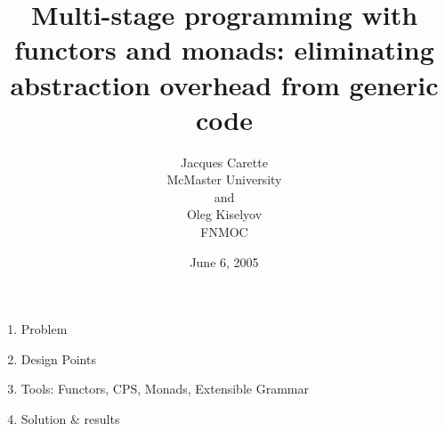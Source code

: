 \documentclass[landscape]{slides}
\begin{document}
\pagestyle{empty}

\setlength{\topmargin}{0in}
\setlength{\headheight}{0.0in}
\setlength{\headsep}{0in}
\setlength{\topskip}{0in}
\setlength{\footskip}{0in}

\newcommand{\vsi}{\vspace{-5mm}}
\newcommand{\vsii}{\vspace{-7mm}}
\newcommand{\vsiii}{\vspace{-11mm}}

\newcommand{\seq}[1]{{\langle #1 \rangle}}
\newcommand{\set}[1]{{\{ #1 \}}}
\newcommand{\tuple}[1]{{( #1 )}}
\newcommand{\mname}[1]{\mbox{\sf #1}}
\newcommand{\Nat}{\mathbb N}


\begin{slide}
\title{Multi-stage programming with functors and monads:
eliminating abstraction overhead from generic code}
\author{Jacques Carette\\
McMaster University\\
and\\
Oleg Kiselyov\\
FNMOC}
\date{June 6, 2005}
\maketitle
\end{slide}

\begin{slide}
\begin{enumerate}
    \item Problem
    \item Design Points
    \item Tools: Functors, CPS, Monads, Extensible Grammar
    \item Solution \& results
\end{enumerate}

\end{slide}
\end{document}
